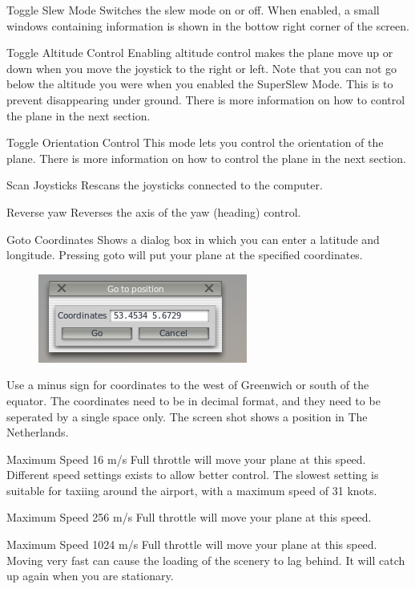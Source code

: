 \documentclass[a4paper,12pt]{article}
\newenvironment{vlist}[1]{%
\begin{list}{}{%
    \settowidth{\labelwidth}{\tt #1 }     %
    \setlength{\leftmargin}{\labelwidth}  %
    \addtolength{\leftmargin}{\labelsep}  %
    \setlength{\parsep}{0.5ex plus 0.2ex minus 0.2ex}
    \setlength{\itemsep}{0.3ex}
    \renewcommand{\makelabel}[1]{\color{headings}\tt ##1 \color{text1}\hfill}}}%
{\end{list}}
\begin{document}
\begin{vlist}{w}

\item[Toggle Slew Mode] Switches the slew mode on or
off. When enabled, a small windows containing information is shown in
the bottow right corner of the screen. 

\item[Toggle Altitude Control] Enabling altitude control makes the
  plane move up or down when you move the joystick to the right or
  left. Note that you can not go below the altitude you were when you
  enabled the SuperSlew Mode. This is to prevent disappearing under
  ground. There is more information on how to control the plane in the
  next section.

\item[Toggle Orientation Control] This mode lets you control the
  orientation of the plane. There is more information on how to
  control the plane in the next section.

\item[Scan Joysticks] Rescans the joysticks connected to the computer.

\item[Reverse yaw] Reverses the axis of the yaw (heading) control.

\item[Goto Coordinates] Shows a dialog box in which you can enter a
  latitude and longitude. Pressing goto will put your plane at the
  specified coordinates.
\begin{figure}[h!]%
\centering
\includegraphics[scale=1]{slewgoto.png}
\label{fig:slewgoto}
\end{figure}
Use a minus sign for coordinates to the west of Greenwich or south
of the equator. The coordinates need to be in decimal format, and they need
to be seperated by a single space only. The screen shot shows a
position in The Netherlands.

\item[Maximum Speed 16 m/s] Full throttle will move your plane at this
  speed. Different speed settings exists to allow better control. The
  slowest setting is suitable for taxiing around the airport, with a
  maximum speed of 31 knots.

\item[Maximum Speed 256 m/s] Full throttle will move your plane at this
  speed. 

\item[Maximum Speed 1024 m/s] Full throttle will move your plane at this
  speed. Moving very fast can cause the loading of the scenery to lag
  behind. It will catch up again when you are stationary.

\end{vlist}{}
\end{document}
